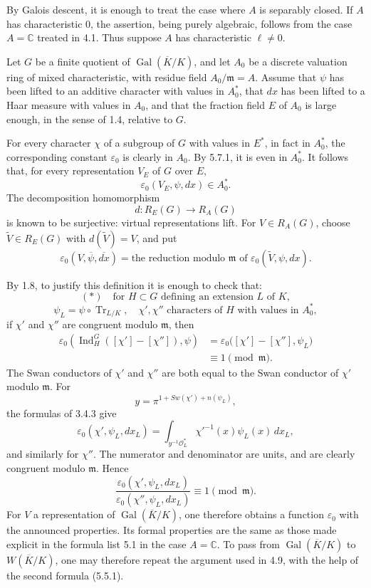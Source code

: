 \documentclass[10pt,letterpaper]{article}
\newcommand{\C}{\mathbb C}
\newcommand{\Gal}{\operatorname{Gal}}
\newcommand{\Ind}{\operatorname{Ind}}
\newcommand{\Tr}{\operatorname{Tr}}
\providecommand{\Gal}{\operatorname{Gal}}
\providecommand{\Gal}{\operatorname{Gal}}
\providecommand{\Tr}{\operatorname{Tr}}
\providecommand{\Gal}{\operatorname{Gal}}
\providecommand{\Tr}{\operatorname{Tr}}
\providecommand{\Gal}{\operatorname{Gal}}
\providecommand{\Tr}{\operatorname{Tr}}
\providecommand{\Ind}{\operatorname{Ind}}
\begin{document}
By Galois descent, it is enough to treat the case where \(A\) is separably closed. If \(A\) has characteristic \(0\), the assertion, being purely algebraic, follows from the case \(A=\C\) treated in 4.1. Thus suppose \(A\) has characteristic \(\ell\ne0\).

Let \(G\) be a finite quotient of \(\Gal(\overline K/K)\), and let \(A_0\) be a discrete valuation ring of mixed characteristic, with residue field \(A_0/\mathfrak m=A\). Assume that \(\psi\) has been lifted to an additive character with values in \(A_0^*\), that \(dx\) has been lifted to a Haar measure with values in \(A_0\), and that the fraction field \(E\) of \(A_0\) is large enough, in the sense of 1.4, relative to \(G\).

For every character \(\chi\) of a subgroup of \(G\) with values in \(E^*\), in fact in \(A_0^*\), the corresponding constant \(\varepsilon_0\) is clearly in \(A_0\). By 5.7.1, it is even in \(A_0^*\). It follows that, for every representation \(V_E\) of \(G\) over \(E\),
\[
\varepsilon_0(V_E,\psi,dx)\in A_0^*.
\]
The decomposition homomorphism
\[
d:R_E(G)\longrightarrow R_A(G)
\]
is known to be surjective: virtual representations lift. For \(V\in R_A(G)\), choose \(\widetilde V\in R_E(G)\) with \(d(\widetilde V)=V\), and put
\[
\varepsilon_0(V,\overline\psi,\overline{dx})
=
\text{the reduction modulo }\mathfrak m\text{ of }
\varepsilon_0(\widetilde V,\psi,dx).
\]

By 1.8, to justify this definition it is enough to check that:
\[
(*)\quad
\text{for }H\subset G\text{ defining an extension }L\text{ of }K,
\]
\[
\psi_L=\psi\circ\Tr_{L/K},\quad
\chi',\chi''\text{ characters of }H\text{ with values in }A_0^*,
\]
if \(\chi'\) and \(\chi''\) are congruent modulo \(\mathfrak m\), then
\[
\begin{aligned}
\varepsilon_0\!\left(\Ind_H^G([\chi']-[\chi'']),\psi\right)
&=\varepsilon_0\bigl([\chi']-[\chi''],\psi_L\bigr)\\
&\equiv1\pmod{\mathfrak m}.
\end{aligned}
\]
The Swan conductors of \(\chi'\) and \(\chi''\) are both equal to the Swan conductor of \(\chi'\) modulo \(\mathfrak m\). For
\[
y=\pi^{1+Sw(\chi')+n(\psi_L)},
\]
the formulas of 3.4.3 give
\[
\varepsilon_0(\chi',\psi_L,dx_L)=
\int_{y^{-1}\mathcal O_L^*}\chi'^{-1}(x)\psi_L(x)\,dx_L,
\]
and similarly for \(\chi''\). The numerator and denominator are units, and are clearly congruent modulo \(\mathfrak m\). Hence
\[
\frac{\varepsilon_0(\chi',\psi_L,dx_L)}
{\varepsilon_0(\chi'',\psi_L,dx_L)}
\equiv1\pmod{\mathfrak m}.
\]
For \(V\) a representation of \(\Gal(\overline K/K)\), one therefore obtains a function \(\varepsilon_0\) with the announced properties. Its formal properties are the same as those made explicit in the formula list 5.1 in the case \(A=\C\). To pass from \(\Gal(\overline K/K)\) to \(W(\overline K/K)\), one may therefore repeat the argument used in 4.9, with the help of the second formula (5.5.1).
\end{document}
